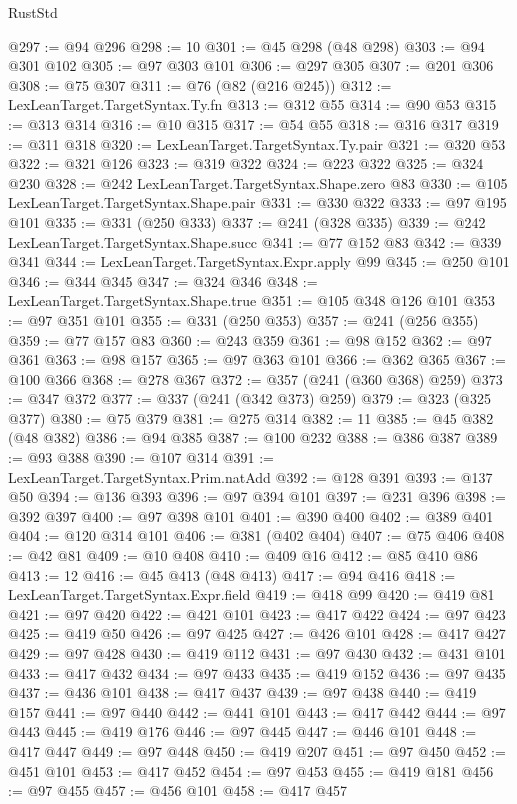 \begin{lexlean}{RustStd}
\begin{coremodule}
@297 := @94 @296
@298 := 10
@301 := @45 @298 (@48 @298)
@303 := @94 @301 @102
@305 := @97 @303 @101
@306 := @297 @305
@307 := @201 @306
@308 := @75 @307
@311 := @76 (@82 (@216 @245))
@312 := LexLeanTarget.TargetSyntax.Ty.fn
@313 := @312 @55
@314 := @90 @53
@315 := @313 @314
@316 := @10 @315
@317 := @54 @55
@318 := @316 @317
@319 := @311 @318
@320 := LexLeanTarget.TargetSyntax.Ty.pair
@321 := @320 @53
@322 := @321 @126
@323 := @319 @322
@324 := @223 @322
@325 := @324 @230
@328 := @242 LexLeanTarget.TargetSyntax.Shape.zero @83
@330 := @105 LexLeanTarget.TargetSyntax.Shape.pair
@331 := @330 @322
@333 := @97 @195 @101
@335 := @331 (@250 @333)
@337 := @241 (@328 @335)
@339 := @242 LexLeanTarget.TargetSyntax.Shape.succ
@341 := @77 @152 @83
@342 := @339 @341
@344 := LexLeanTarget.TargetSyntax.Expr.apply @99
@345 := @250 @101
@346 := @344 @345
@347 := @324 @346
@348 := LexLeanTarget.TargetSyntax.Shape.true
@351 := @105 @348 @126 @101
@353 := @97 @351 @101
@355 := @331 (@250 @353)
@357 := @241 (@256 @355)
@359 := @77 @157 @83
@360 := @243 @359
@361 := @98 @152
@362 := @97 @361
@363 := @98 @157
@365 := @97 @363 @101
@366 := @362 @365
@367 := @100 @366
@368 := @278 @367
@372 := @357 (@241 (@360 @368) @259)
@373 := @347 @372
@377 := @337 (@241 (@342 @373) @259)
@379 := @323 (@325 @377)
@380 := @75 @379
@381 := @275 @314
@382 := 11
@385 := @45 @382 (@48 @382)
@386 := @94 @385
@387 := @100 @232
@388 := @386 @387
@389 := @93 @388
@390 := @107 @314
@391 := LexLeanTarget.TargetSyntax.Prim.natAdd
@392 := @128 @391
@393 := @137 @50
@394 := @136 @393
@396 := @97 @394 @101
@397 := @231 @396
@398 := @392 @397
@400 := @97 @398 @101
@401 := @390 @400
@402 := @389 @401
@404 := @120 @314 @101
@406 := @381 (@402 @404)
@407 := @75 @406
@408 := @42 @81
@409 := @10 @408
@410 := @409 @16
@412 := @85 @410 @86
@413 := 12
@416 := @45 @413 (@48 @413)
@417 := @94 @416
@418 := LexLeanTarget.TargetSyntax.Expr.field
@419 := @418 @99
@420 := @419 @81
@421 := @97 @420
@422 := @421 @101
@423 := @417 @422
@424 := @97 @423
@425 := @419 @50
@426 := @97 @425
@427 := @426 @101
@428 := @417 @427
@429 := @97 @428
@430 := @419 @112
@431 := @97 @430
@432 := @431 @101
@433 := @417 @432
@434 := @97 @433
@435 := @419 @152
@436 := @97 @435
@437 := @436 @101
@438 := @417 @437
@439 := @97 @438
@440 := @419 @157
@441 := @97 @440
@442 := @441 @101
@443 := @417 @442
@444 := @97 @443
@445 := @419 @176
@446 := @97 @445
@447 := @446 @101
@448 := @417 @447
@449 := @97 @448
@450 := @419 @207
@451 := @97 @450
@452 := @451 @101
@453 := @417 @452
@454 := @97 @453
@455 := @419 @181
@456 := @97 @455
@457 := @456 @101
@458 := @417 @457

\end{coremodule}
\end{lexlean}
